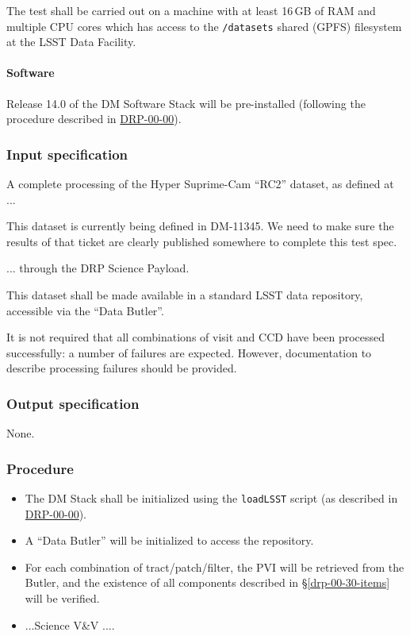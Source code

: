 The test shall be carried out on a machine with at least 16\,GB of RAM and
multiple CPU cores which has access to the \texttt{/datasets} shared (GPFS)
filesystem at the LSST Data Facility.

\paragraph{Software}

Release 14.0 of the DM Software Stack will be pre-installed (following the
procedure described in \hyperref[drp-00-00]{DRP-00-00}).

\subsubsection{Input specification}

A complete processing of the Hyper Suprime-Cam ``RC2'' dataset, as defined
at ...

\begin{note}
This dataset is currently being defined in DM-11345. We need to make sure the
results of that ticket are clearly published somewhere to complete this test
spec.

\end{note}

... through the DRP Science Payload.

This dataset shall be made available in a standard LSST data repository,
accessible via the ``Data Butler''.

It is not required that all combinations of visit and CCD have been processed
successfully: a number of failures are expected. However, documentation to
describe processing failures should be provided.

\subsubsection{Output specification}

None.

\subsubsection{Procedure}

\begin{itemize}

  \item{The DM Stack shall be initialized using the \texttt{loadLSST} script
  (as described in \hyperref[drp-00-00]{DRP-00-00}).}

  \item{A ``Data Butler'' will be initialized to access the repository.}

  \item{For each combination of tract/patch/filter, the PVI will be retrieved
  from the Butler, and the existence of all components described in
  \S\ref{drp-00-30-items} will be verified.}

  \item{...Science V\&V ....}

\end{itemize}
